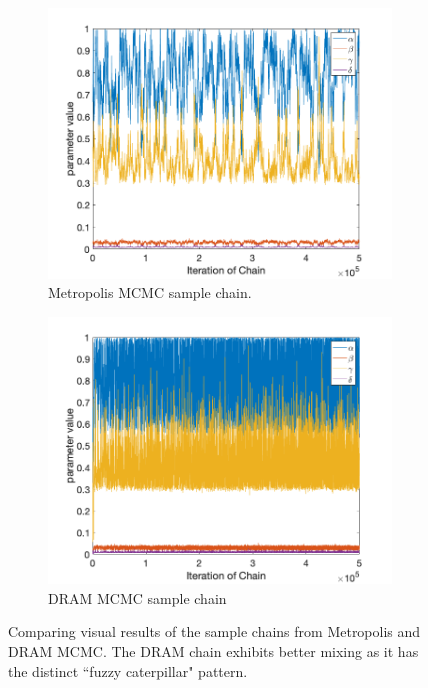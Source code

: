 \begin{figure}[H]
\begin{subfigure}{.5\textwidth}
  \centering
  \includegraphics[width=1\linewidth]{MCMC_figs/met_lv_final/final_mh_chain.png}
  \caption{Metropolis MCMC sample chain.}
  \label{fig:11amcmcm}
\end{subfigure}
\begin{subfigure}{.5\textwidth}
  \centering
  \includegraphics[width=1\linewidth]{MCMC_figs/met_lv_final/final_dram_chain.png}
  \caption{DRAM MCMC sample chain}
  \label{fig:11bmcmcm} 
\end{subfigure}
\caption{Comparing visual results of the sample chains from Metropolis and DRAM MCMC. The DRAM chain exhibits better mixing as it has the distinct ``fuzzy caterpillar" pattern.}
\label{fig:11mcmc}
\end{figure}
